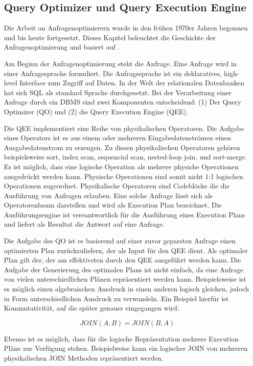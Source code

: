 

\subsection{Query Optimizer und Query Execution Engine}
Die Arbeit an Anfragenoptimierern wurde in den frühen 1970er Jahren begonnen und bis heute fortgesetzt. Dieses Kapitel beleuchtet die Geschichte der Anfragenoptimierung und basiert auf \cite{chaudhuri1998overview}.


Am Beginn der Anfragenoptimierung steht die Anfrage. Eine Anfrage wird in einer Anfragesprache formuliert. Die Anfragesprache ist ein deklaratives, high-level Interface zum Zugriff auf Daten. In der Welt der relationalen Datenbanken hat sich SQL als standard Sprache durchgesetzt. Bei der Verarbeitung einer Anfrage durch ein DBMS sind zwei Komponenten entscheidend: (1) Der Query Optimizer  (QO) und (2) die Query Execution Engine (QEE).

Die QEE implementiert eine Reihe von physikalischen Operatoren. Die Aufgabe eines Operators ist es aus einem oder mehreren Eingabedatenströmen einen Ausgabedatenstrom zu erzeugen. Zu diesen physikalischen Operatoren gehören beispielsweise sort, index scan, sequencial scan, nested-loop join, und sort-merge. Es ist möglich, dass eine logische Operation als mehrere physiche Operationen ausgedrückt werden kann. Physische Operationen sind somit nicht 1:1 logischen Operationen zugeordnet. Physikalische Operatoren sind Codeblöcke die die Ausführung von Anfragen erlauben. Eine solche Anfrage lässt sich als Operatorenbaum darstellen und wird als Execution Plan bezeichnet. Die Ausführungsengine ist vereantwortlich für die Ausführung eines Execution Plans und liefert als Resultat die Antwort auf eine Anfrage.

Die Aufgabe des QO ist es basierend auf einer zuvor geparsten Anfrage einen optimierten Plan zurückzuliefern, der als Input für den QEE dient. Als optimaler Plan gilt der, der am effektivsten durch den QEE ausgeführt werden kann. Die Aufgabe der Generierung des optimalen Plans ist nicht einfach, da eine Anfrage von vielen unterschiedlichen Plänen repräsentiert werden kann. Beispielsweise ist es möglich einen algebraischen Ausdruck in einen anderen logisch gleichen, jedoch in Form unterschiedlichen Ausdruck zu verwandeln. Ein Beispiel hierfür ist Kommutativität, auf die später genauer eingegangen wird:

$$ JOIN(A,B) = JOIN(B,A)$$

Ebenso ist es möglich, dass für die logische Repräsentation mehrere Execution Pläne zur Verfügung stehen. Beispielweise kann ein logischer JOIN von mehreren physikalischen JOIN Methoden repräsentiert werden.

